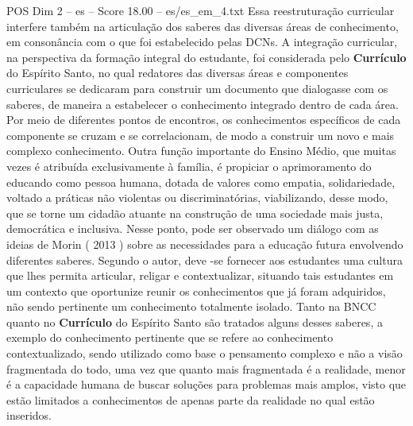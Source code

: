 \begin{textsample}{POS Dim 2 – es – Score 18.00 – es/es\_em\_4.txt}
Essa reestruturação curricular interfere também na articulação dos saberes das diversas áreas de conhecimento, em consonância com o que foi estabelecido pelas DCNs.
A integração curricular, na perspectiva da formação integral do estudante, foi considerada pelo \textbf{Currículo} do Espírito Santo, no qual redatores das diversas áreas e componentes curriculares se dedicaram para construir um documento que dialogasse com os saberes, de maneira a estabelecer o conhecimento integrado dentro de cada área.
Por meio de diferentes pontos de encontros, os conhecimentos específicos de cada componente se cruzam e se correlacionam, de modo a construir um novo e mais complexo conhecimento.
Outra função importante do Ensino Médio, que muitas vezes é atribuída exclusivamente à família, é propiciar o aprimoramento do educando como pessoa humana, dotada de valores como empatia, solidariedade, voltado a práticas não violentas ou discriminatórias, viabilizando, desse modo, que se torne um cidadão atuante na construção de uma sociedade mais justa, democrática e inclusiva.
Nesse ponto, pode ser observado um diálogo com as ideias de Morin ( 2013 ) sobre as necessidades para a educação futura envolvendo diferentes saberes.
Segundo o autor, deve -se fornecer aos estudantes uma cultura que lhes permita articular, religar e contextualizar, situando tais estudantes em um contexto que oportunize reunir os conhecimentos que já foram adquiridos, não sendo pertinente um conhecimento totalmente isolado.
Tanto na BNCC quanto no \textbf{Currículo} do Espírito Santo são tratados alguns desses saberes, a exemplo do conhecimento pertinente que se refere ao conhecimento contextualizado, sendo utilizado como base o pensamento complexo e não a visão fragmentada do todo, uma vez que quanto mais fragmentada é a realidade, menor é a capacidade humana de buscar soluções para problemas mais amplos, visto que estão limitados a conhecimentos de apenas parte da realidade no qual estão inseridos.

\end{textsample}
